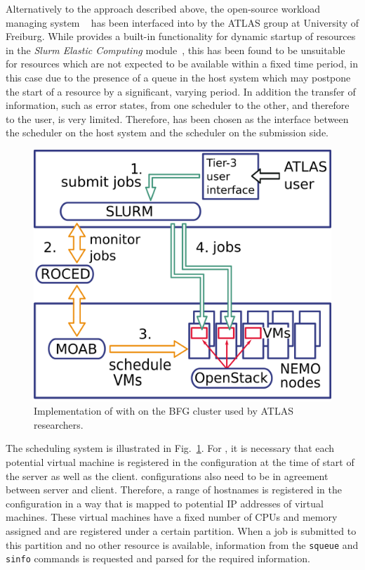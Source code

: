 Alternatively to the approach described above, the
open-source workload managing system \Slurm~\cite{Slurm} has been interfaced into \Roced by
the ATLAS group at University of Freiburg.
While \Slurm provides a built-in functionality for dynamic
startup of resources in the \textit{Slurm Elastic Computing} module~\cite{SlurmElastic}, this has been found to be unsuitable for resources which are not
expected to be available within a fixed time period, in this case due to
the presence of a queue in the host system which may postpone the start
of a resource by a significant, varying period.
In addition the transfer of information, such as error states, from one scheduler to the
other, and therefore to the user, is very limited.
Therefore, \Roced has been chosen as the interface between the
\Moab scheduler on the host system and the \Slurm
scheduler on the submission side.


\begin{figure}

\includegraphics[width=0.95\linewidth]{figures/virtualisierung_ROCED.png}
\caption{Implementation of \Roced with \Slurm on the BFG cluster used by ATLAS researchers.}
\label{fig:slurmRocedBFG}
\end{figure}

The scheduling system is illustrated in Fig.~\ref{fig:slurmRocedBFG}.
For \Slurm, it is necessary that each potential virtual
machine is registered in the configuration at the time of start of the
\Slurm server as well as the client. \Slurm configurations also
need to be in agreement between server and client.
Therefore, a range of hostnames is registered in the configuration in
a way that is mapped to potential IP addresses of virtual machines.
These virtual machines have a fixed number of CPUs and memory assigned and are
registered under a certain \Slurm partition.
When a job is submitted to this partition and no other resource is
available, information from the \Slurm \texttt{squeue} and
\texttt{sinfo} commands is requested and parsed for the required information.

